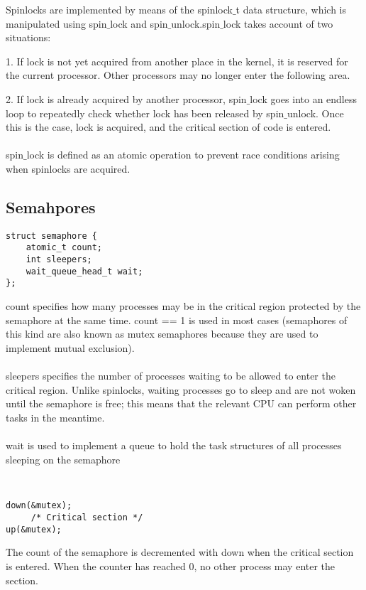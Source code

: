 \documentclass[a4paper]{article}
\begin{document}
Spinlocks are implemented by means of the spinlock$\_$t data structure, which is manipulated using spin$\_$lock and spin$\_$unlock.spin$\_$lock takes
account of two situations:

1. If lock is not yet acquired from another place in the kernel, it is reserved for the current
processor. Other processors may no longer enter the following area.

2. If lock is already acquired by another processor, spin$\_$lock goes into an endless loop to
repeatedly check whether lock has been released by spin$\_$unlock.
Once this is the case, lock is acquired, and the critical section of code is entered. 
\\~\\
spin$\_$lock is defined as an atomic operation to prevent race conditions arising when spinlocks are acquired.
 
\subsection{Semahpores}

\begin{verbatim}
struct semaphore {
    atomic_t count;
    int sleepers;
    wait_queue_head_t wait;
};
\end{verbatim}

 count specifies how many processes may be in the critical region protected by the semaphore at
the same time. count == 1 is used in most cases (semaphores of this kind are also known as mutex
semaphores because they are used to implement mutual exclusion).
\\~\\
sleepers specifies the number of processes waiting to be allowed to enter the critical region.
Unlike spinlocks, waiting processes go to sleep and are not woken until the semaphore is free;
this means that the relevant CPU can perform other tasks in the meantime.
\\~\\
wait is used to implement a queue to hold the task structures of all processes sleeping on the
semaphore


\begin{verbatim}


down(&mutex);
     /* Critical section */
up(&mutex);
\end{verbatim}

The count of the semaphore is decremented with down when the critical section is entered. When the counter has
reached 0, no other process may enter the section.
\end{document}

